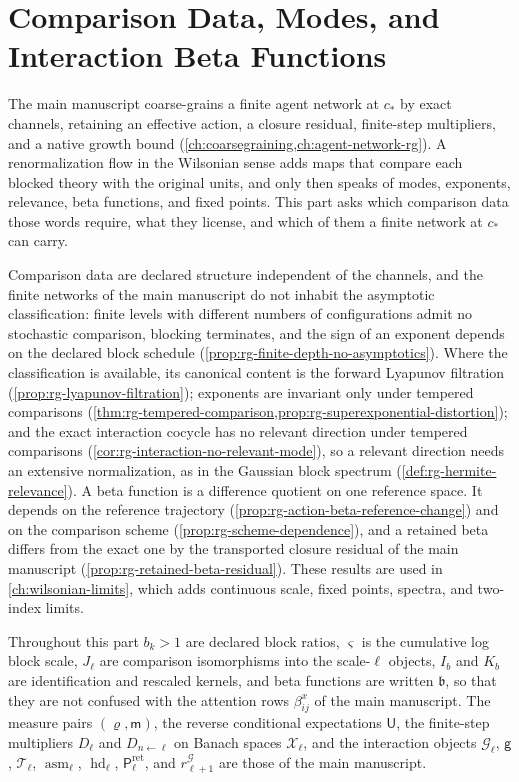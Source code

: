 \chapter{Comparison Data, Modes, and Interaction Beta Functions}
\label{ch:renormalization}

The main manuscript coarse-grains a finite agent network at \(c_*\) by exact
channels, retaining an effective action, a closure residual, finite-step
multipliers, and a native growth bound
(\cref{ch:coarsegraining,ch:agent-network-rg}). A renormalization flow in the
Wilsonian sense adds maps that compare each blocked theory with the original
units, and only then speaks of modes, exponents, relevance, beta functions,
and fixed points. This part asks which comparison data those words require,
what they license, and which of them a finite network at \(c_*\) can carry.

Comparison data are declared structure independent of the channels, and the
finite networks of the main manuscript do not inhabit the asymptotic
classification: finite levels with different numbers of configurations admit
no stochastic comparison, blocking terminates, and the sign of an exponent
depends on the declared block schedule
(\cref{prop:rg-finite-depth-no-asymptotics}). Where the
classification is available, its canonical content is the forward Lyapunov
filtration (\cref{prop:rg-lyapunov-filtration}); exponents are invariant
only under tempered comparisons
(\cref{thm:rg-tempered-comparison,prop:rg-superexponential-distortion}); and
the exact interaction cocycle has no relevant direction under tempered
comparisons (\cref{cor:rg-interaction-no-relevant-mode}), so a relevant
direction needs an extensive normalization, as in the Gaussian block spectrum
(\cref{def:rg-hermite-relevance}). A beta function is a difference quotient on
one reference space. It depends on the reference trajectory
(\cref{prop:rg-action-beta-reference-change}) and on the comparison scheme
(\cref{prop:rg-scheme-dependence}), and a retained beta differs from the exact
one by the transported closure residual of the main manuscript
(\cref{prop:rg-retained-beta-residual}). These results are used in
\cref{ch:wilsonian-limits}, which adds continuous scale, fixed points,
spectra, and two-index limits.

Throughout this part \(b_k>1\) are declared block ratios, \(\varsigma\) is the
cumulative log block scale, \(J_\ell\) are comparison isomorphisms into the
scale-\(\ell\) objects, \(I_b\) and \(K_b\) are identification and rescaled
kernels, and beta functions are written \(\mathfrak b\), so that they are not
confused with the attention rows \(\beta^x_{ij}\) of the main manuscript. The
measure pairs \((\varrho,\mathsf m)\), the reverse conditional expectations
\(\mathsf U\), the finite-step multipliers \(D_\ell\) and
\(D_{n\leftarrow\ell}\) on Banach spaces \(\mathscr X_\ell\), and the
interaction objects \(\mathcal G_\ell\), \(\mathsf g\), \(\mathcal T_\ell\),
\(\operatorname{asm}_\ell\), \(\operatorname{hd}_\ell\),
\(\mathsf P^{\mathrm{ret}}_\ell\), and \(r^{\mathcal G}_{\ell+1}\) are those of
the main manuscript.

